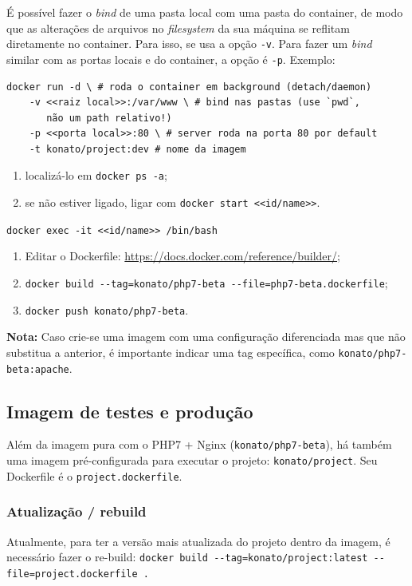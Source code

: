 \documentclass[12pt,a4paper,twoside,hyphens,english,brazil]{abntex2}
\begin{document}
{
É possível fazer o \emph{bind} de uma pasta local com uma pasta do container, de modo que as alterações de arquivos no \emph{filesystem} da sua máquina se reflitam diretamente no container. Para isso, se usa a opção \texttt{-v}. Para fazer um \emph{bind} similar com as portas locais e do container, a opção é \texttt{-p}. Exemplo:
\begin{verbatim}
docker run -d \ # roda o container em background (detach/daemon)
    -v <<raiz local>>:/var/www \ # bind nas pastas (use `pwd`,
       não um path relativo!)
    -p <<porta local>>:80 \ # server roda na porta 80 por default
    -t konato/project:dev # nome da imagem
\end{verbatim}
    
\begin{enumerate}[itemsep=-1ex]
	\item localizá-lo em \texttt{docker ps -a};
	\item se não estiver ligado, ligar com \texttt{docker start <<id/name>>}.
\end{enumerate}

\texttt{docker exec -it <<id/name>> /bin/bash}

\begin{enumerate}[itemsep=-1ex]
	\item Editar o Dockerfile: \url{https://docs.docker.com/reference/builder/};
	\item \texttt{docker build -{}-tag=konato/php7-beta -{}-file=php7-beta.dockerfile};
	\item \texttt{docker push konato/php7-beta}.
\end{enumerate}
\textbf{Nota:} Caso crie-se uma imagem com uma configuração diferenciada mas que não substitua a anterior, é importante indicar uma tag específica, como \texttt{konato/php7-beta:apache}.

\subsection{Imagem de testes e produção}
Além da imagem pura com o PHP7 + Nginx (\texttt{konato/php7-beta}), há também uma imagem pré-configurada para executar o projeto: \texttt{konato/project}. Seu Dockerfile é o \texttt{project.dockerfile}.

\subsubsection{Atualização / rebuild}
Atualmente, para ter a versão mais atualizada do projeto dentro da imagem, é necessário fazer o re-build: \texttt{docker build -{}-tag=konato/project:latest -{}-file=project.dockerfile .}
    
}
\end{document}
